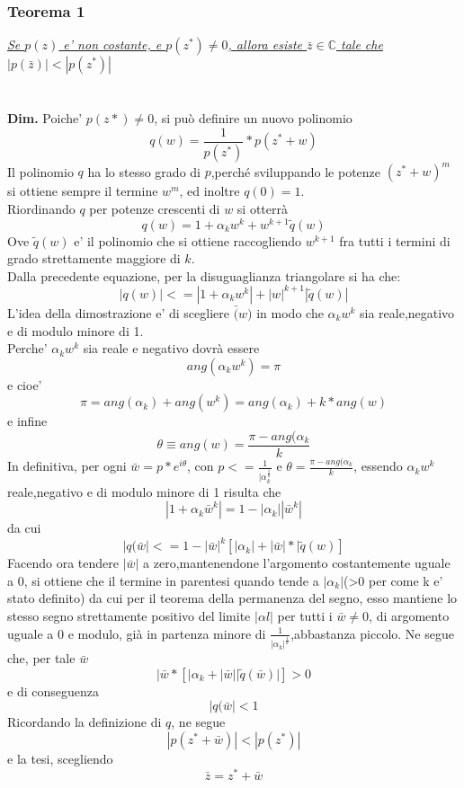 \documentclass[fontsize = 20px, paper = a4]{article}
\begin{document}
\subsubsection{Teorema 1}
\textit{\underline{Se $p(z)$ e' non costante, e $p(z^*) \neq 0$, allora esiste $\bar{z} \in \mathbb{C}$ tale che $|p(\bar{z})| < |p(z^*)|$ }}\\\\\\
\textbf{Dim.} Poiche'  $p(z*) \neq 0$, si può definire un nuovo polinomio
$$q(w) = \frac{1}{p(z^*)}* p(z^* + w) $$
Il polinomio $q$ ha lo stesso grado di $p$,perché  sviluppando le potenze $(z^* + w)^m$ si ottiene sempre il termine $w^m$, ed inoltre $q(0) = 1$.\\
Riordinando $q$ per potenze crescenti di $w$ si otterrà
$$q(w) = 1 + \alpha_{k}w^k +w^{k+1}\tilde{q}(w)$$
Ove $\tilde{q}(w)$ e' il polinomio che si ottiene raccogliendo $w^{k+1}$ fra tutti i termini di grado strettamente maggiore di $k$.\\
Dalla precedente equazione, per la disuguaglianza triangolare si ha che:
$$|q(w)| <= |1 + \alpha_{k}w^k| + |w|^{k+1} |\tilde{q}(w)|$$
L'idea della dimostrazione e' di scegliere $\bar(w)$ in modo che $\alpha_{k}w^k$ sia reale,negativo e di modulo minore di 1.\\
Perche' $\alpha_{k}w^k$ sia reale e negativo dovrà essere 
$$ang(\alpha_{k}w^k) = \pi $$
e cioe'
$$\pi = ang(\alpha_{k}) + ang(w^k) = ang(\alpha_{k}) + k*ang(w) $$
e infine
$$\theta \equiv ang(w) = \frac{\pi - ang(\alpha_{k}}{k}$$
In definitiva, per ogni $\bar{w} = p*e^{i\theta}$, con $p <= \frac{1}{|\alpha_{k}^{\frac{1}{k}}}$ e $\theta = \frac{\pi - ang(\alpha_{k}}{k}$, essendo $\alpha_{k}w^{k}$ reale,negativo e di modulo minore di 1 risulta che 
$$|1 + \alpha_{k}\bar{w}^k| = 1 - |\alpha_{k}||\bar{w}^k|$$
da cui 
$$|q(\bar{w}| <= 1 - |\bar{w}|^k [|\alpha_{k}|+ |\bar{w}|*|\tilde{q}(w)]$$
Facendo ora tendere $|\bar{w}|$ a zero,mantenendone l'argomento costantemente uguale a 0, si ottiene che il termine in parentesi quando tende a $|\alpha_{k}|$(>0 per come k e' stato definito) da cui per il teorema della permanenza del segno, esso mantiene lo stesso segno strettamente positivo del limite $|\alpha{l}|$ per tutti i $\bar{w} \neq 0$, di argomento uguale a 0 e modulo, già in partenza minore di $\frac{1}{|\alpha_{k}|^{\frac{1}{k}}}$,abbastanza piccolo. Ne segue che, per tale $\bar{w}$
$$|\bar{w}*[|\alpha_{k} + |\bar{w}||\tilde{q}(\bar{w})|] > 0$$
e di conseguenza
$$|q(\bar{w}| < 1$$
Ricordando la definizione di $q$, ne segue
$$|p(z^* + \bar{w})| < |p(z^*)|$$
e la tesi, scegliendo
$$\bar{z} = z^* + \bar{w}$$
\end{document}
